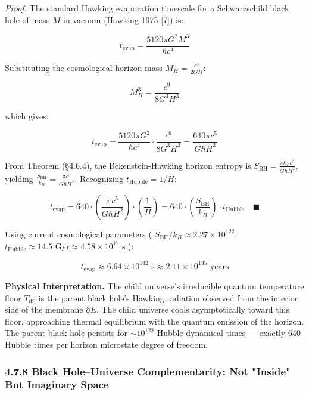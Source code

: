 \documentclass[11pt,a4paper]{article}
\theoremstyle{definition}\newtheorem{definition}{Definition}
\theoremstyle{remark}\newtheorem{remark}{Remark}
\begin{document}
\textit{Proof.} The standard Hawking evaporation timescale for a Schwarzschild black hole of mass $M$ in vacuum (Hawking 1975 [7]) is:


\begin{equation}
t_{\text{evap}} = \frac{5120\pi G^2 M^3}{\hbar c^4}
\end{equation}


Substituting the cosmological horizon mass $M_H = \frac{c^3}{2GH}$:


\begin{equation}
M_H^3 = \frac{c^9}{8 G^3 H^3}
\end{equation}


which gives:


\begin{equation}
t_{\text{evap}} = \frac{5120\pi G^2}{\hbar c^4} \cdot \frac{c^9}{8 G^3 H^3} = \frac{640\pi c^5}{G\hbar H^3}
\end{equation}


From Theorem (§4.6.4), the Bekenstein-Hawking horizon entropy is $S_{\text{BH}} = \frac{\pi k_B c^5}{G\hbar H^2}$, yielding $\frac{S_{\text{BH}}}{k_B} = \frac{\pi c^5}{G\hbar H^2}$. Recognizing $t_{\text{Hubble}} = 1/H$:


\begin{equation}
t_{\text{evap}} = 640 \cdot \left(\frac{\pi c^5}{G\hbar H^2}\right) \cdot \left(\frac{1}{H}\right) = 640 \cdot \left(\frac{S_{\text{BH}}}{k_B}\right) \cdot t_{\text{Hubble}} \quad \blacksquare
\end{equation}


Using current cosmological parameters ( $S_{\text{BH}}/k_B \approx 2.27 \times 10^{122}$, $t_{\text{Hubble}} \approx 14.5 \text{ Gyr} \approx 4.58 \times 10^{17} \text{ s}$ ):


\begin{equation}
t_{\text{evap}} \approx 6.64 \times 10^{142} \text{ s} \approx 2.11 \times 10^{135} \text{ years}
\end{equation}


\textbf{Physical Interpretation.} The child universe's irreducible quantum temperature floor $T_{\text{dS}}$ is the parent black hole's Hawking radiation observed from the interior side of the membrane $\partial E$. The child universe cools asymptotically toward this floor, approaching thermal equilibrium with the quantum emission of the horizon. The parent black hole persists for $\sim 10^{122}$ Hubble dynamical times — exactly 640 Hubble times per horizon microstate degree of freedom.
\subsubsection{4.7.8 Black Hole–Universe Complementarity: Not "Inside" But Imaginary Space}
\end{document}

